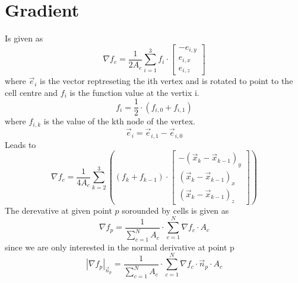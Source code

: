\section{Gradient}
Is given as
\begin{equation}
  \nabla f_c = \frac{1}{2 A_c} \sum_{i = 1}^3 f_i \cdot
  \begin{bmatrix}
    -e_{i, y} \\
    e_{i, x} \\
    e_{i, z}
  \end{bmatrix}
\end{equation}
where $\vec{e}_i$ is the vector reptreseting the ith vertex and is rotated to point to the cell centre and $f_i$ is the function value at the vertix i.
\begin{equation}
  f_i = \frac{1}{2} \cdot (f_{i, 0} + f_{i, 1})
\end{equation}
where $f_{i, k}$ is the value of the kth node of the vertex.
\begin{equation}
  \vec{e}_i = \vec{e}_{i, 1} - \vec{e}_{i, 0}
\end{equation}
Leads to
\begin{equation}
  \nabla f_c = \frac{1}{4 A_c} \sum_{k = 2}^3 \left( (f_k + f_{k - 1}) \cdot
  \begin{bmatrix}
    -(\vec{x}_{k} - \vec{x}_{k - 1})_y\\
    (\vec{x}_{k} - \vec{x}_{k - 1})_x \\
    (\vec{x}_{k} - \vec{x}_{k - 1})_z
  \end{bmatrix}
  \right)
\end{equation}
The derevative at given point $p$ sorounded by cells is given as
\begin{equation}
  \nabla f_p = \frac{1}{\sum_{c = 1}^N A_c} \cdot \sum_{c = 1}^N \nabla f_c \cdot A_c
\end{equation}
since we are only interested in the normal derivative at point p
\begin{equation}
  \left|\nabla f_p\right|_{\vec{n}_p} = \frac{1}{\sum_{c = 1}^N A_c} \cdot \sum_{c = 1}^N \nabla f_c \cdot \vec{n}_p \cdot A_c
\end{equation}
